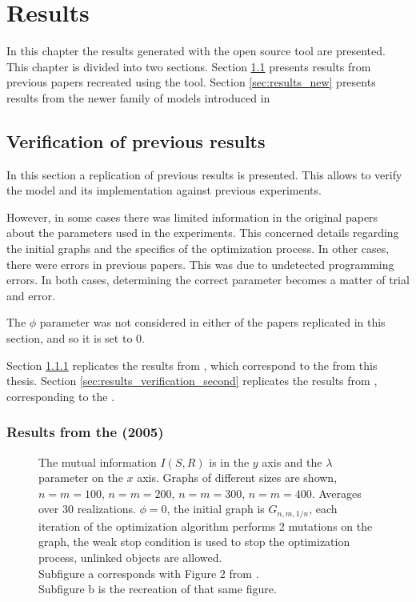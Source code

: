 \chapter{Results}
\label{cha:results}

In this chapter the results generated with the open source tool are presented.
This chapter is divided into two sections.
Section \ref{sec:results_verification} presents results from previous papers recreated using the tool.
Section \ref{sec:results_new} presents results from the newer family of models introduced in \cite{Ferrer2018a}

\section{Verification of previous results}
\label{sec:results_verification}

In this section a replication of previous results is presented.
This allows to verify the model and its implementation against previous experiments.

However, in some cases there was limited information in the original papers about the parameters used in the experiments.
This concerned details regarding the initial graphs and the specifics of the optimization process.
In other cases, there were errors in previous papers.
This was due to undetected programming errors.
In both cases, determining the correct parameter becomes a matter of trial and error.

The $\phi$ parameter was not considered in either of the papers replicated in this section, and so it is set to 0.

Section \ref{sec:results_verification_first} replicates the results from \cite{Ferrer2005a}, which correspond to the \firstmodel{} from this thesis.
Section \ref{sec:results_verification_second} replicates the results from \cite{Ferrer2003a}, corresponding to the \secondmodel{}.

\subsection{Results from the \firstmodel{} (2005)}
\label{sec:results_verification_first}

\begin{figure}
  \caption{
    The mutual information $I(S,R)$ is in the $y$ axis and the $\lambda$ parameter on the $x$ axis.
    Graphs of different sizes are shown, $n=m=100$, $n=m=200$, $n=m=300$, $n=m=400$.
    Averages over 30 realizations.
    $\phi=0$, the initial graph is $G_{n,m,1/n}$, each iteration of the optimization algorithm performs 2 mutations on the graph, the weak stop condition is used to stop the optimization process, unlinked objects are allowed.\\
    Subfigure a corresponds with Figure 2 from \cite{Ferrer2005a}.\\
    Subfigure b is the recreation of that same figure.
  }
  \label{fig:fig2_2005}
\end{figure}

